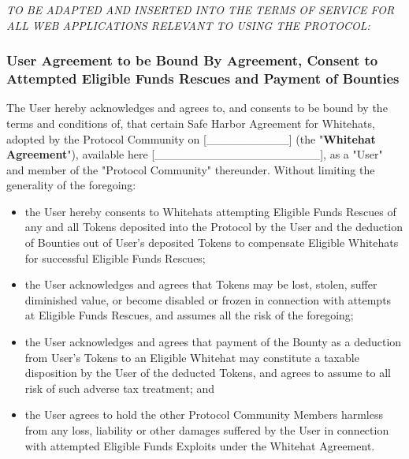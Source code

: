 \textit{TO BE ADAPTED AND INSERTED INTO THE TERMS OF SERVICE FOR ALL WEB APPLICATIONS RELEVANT TO USING THE PROTOCOL:}

\subsubsection*{User Agreement to be Bound By Agreement, Consent to Attempted Eligible Funds Rescues and Payment of Bounties}\label{exhibit:d:user_agreement}

The User hereby acknowledges and agrees to, and consents to be bound by the terms and conditions of, that certain Safe Harbor Agreement for Whitehats, adopted by the Protocol Community on [\_\_\_\_\_\_\_\_\_\_] (the "\textbf{Whitehat Agreement}"), available here [\_\_\_\_\_\_\_\_\_\_\_\_\_\_\_\_\_\_\_\_], as a "User" and member of the "Protocol Community" thereunder. Without limiting the generality of the foregoing:

\begin{itemize}
    \item the User hereby consents to Whitehats attempting Eligible Funds Rescues of any and all Tokens deposited into the Protocol by the User and the deduction of Bounties out of User's deposited Tokens to compensate Eligible Whitehats for successful Eligible Funds Rescues;

    \item the User acknowledges and agrees that Tokens may be lost, stolen, suffer diminished value, or become disabled or frozen in connection with attempts at Eligible Funds Rescues, and assumes all the risk of the foregoing;

    \item the User acknowledges and agrees that payment of the Bounty as a deduction from User's Tokens to an Eligible Whitehat may constitute a taxable disposition by the User of the deducted Tokens, and agrees to assume to all risk of such adverse tax treatment; and

    \item the User agrees to hold the other Protocol Community Members harmless from any loss, liability or other damages suffered by the User in connection with attempted Eligible Funds Exploits under the Whitehat Agreement.
\end{itemize}
